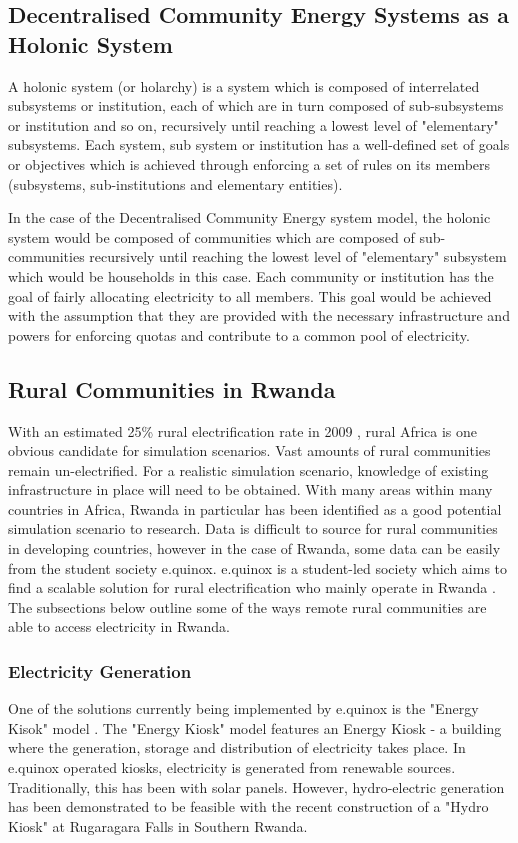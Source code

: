 \documentclass{article}
\begin{document}
\subsection{Decentralised Community Energy Systems as a Holonic System}
A holonic system (or holarchy) is a system which is composed of interrelated subsystems or institution, each of which are in turn composed of sub-subsystems  or institution and so on, recursively until reaching a lowest level of "elementary" subsystems. Each system, sub system or institution has a well-defined set of goals or objectives which is achieved through enforcing a set of rules on its members (subsystems, sub-institutions and elementary entities). 

In the case of the Decentralised Community Energy system model, the holonic system would be composed of communities which are composed of sub-communities recursively until reaching the lowest level of "elementary" subsystem which would be households in this case. Each community or institution has the goal of fairly allocating electricity to all members. This goal would be achieved with the assumption that they are provided with the necessary infrastructure and powers for enforcing quotas and contribute to a common pool of electricity.


\subsection{Rural Communities in Rwanda}
With an estimated 25\% rural electrification rate in 2009 \cite{IEA-web:2015}, rural Africa is one obvious candidate for simulation scenarios. Vast amounts of rural communities remain un-electrified. For a realistic simulation scenario, knowledge of existing infrastructure in place will need to be obtained. With many areas within many countries in Africa, Rwanda in particular has been identified as a good potential simulation scenario to research. Data is difficult to source for rural communities in developing countries, however in the case of Rwanda, some data can be easily from the student society e.quinox. e.quinox is a student-led society which aims to find a scalable solution for rural electrification who mainly operate in Rwanda \cite{e.quinox-web:2015}. The subsections below outline some of the ways remote rural communities are able to access electricity in Rwanda.

\subsubsection{Electricity Generation}
One of the solutions currently being implemented by e.quinox is the "Energy Kisok" model \cite{e.quinox-EK-web:2015}. The "Energy Kiosk" model features an Energy Kiosk - a building where the generation, storage and distribution of electricity takes place.
In e.quinox operated kiosks, electricity is generated from renewable sources.
Traditionally, this has been with solar panels. However, hydro-electric generation has been demonstrated to be feasible with the recent construction of a "Hydro Kiosk" at Rugaragara Falls in Southern Rwanda.
\end{document}
